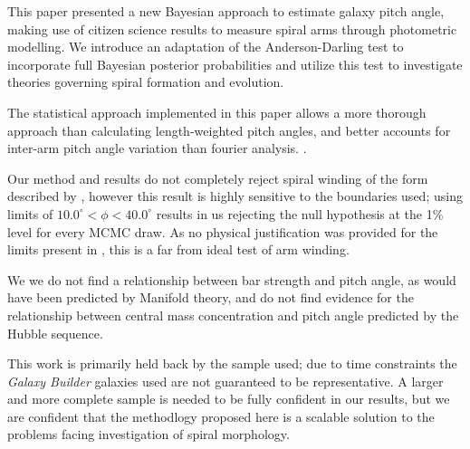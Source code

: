 This paper presented a new Bayesian approach to estimate galaxy pitch angle, making use of citizen science results to measure spiral arms through photometric modelling. We introduce an adaptation of the Anderson-Darling test to incorporate full Bayesian posterior probabilities and utilize this test to investigate theories governing spiral formation and evolution.

The statistical approach implemented in this paper allows a more thorough approach than calculating length-weighted pitch angles, and better accounts for inter-arm pitch angle variation than fourier analysis. .

Our method and results do not completely reject spiral winding of the form described by \citet{2019arXiv190910291P}, however this result is highly sensitive to the boundaries used; using limits of $10.0^\circ < \phi < 40.0^\circ$ results in us rejecting the null hypothesis at the 1\% level for every MCMC draw. As no physical justification was provided for the limits present in \citet{2019arXiv190910291P}, this is a far from ideal test of arm winding.

We we do not find a relationship between bar strength and pitch angle, as would have been predicted by Manifold theory, and do not find evidence for the relationship between central mass concentration and pitch angle predicted by the Hubble sequence.

This work is primarily held back by the sample used; due to time constraints the \textit{Galaxy Builder} galaxies used are not guaranteed to be representative. A larger and more complete sample is needed to be fully confident in our results, but we are confident that the methodlogy proposed here is a scalable solution to the problems facing investigation of spiral morphology.
